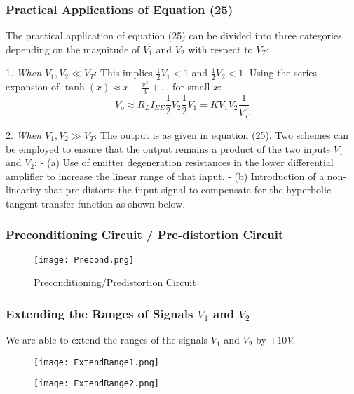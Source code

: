 \documentclass[a4paper,9pt,twoside,openany,twocolumn]{memoir}
\begin{document}
\subsubsection{Practical Applications of Equation (25)}

The practical application of equation (25) can be divided into three categories depending on the magnitude of \( V_1 \) and \( V_2 \) with respect to \( V_T \):

1. \textit{When \( V_1, V_2 \ll V_T \)}: 
   This implies \( \frac{1}{2} V_1 < 1 \) and \( \frac{1}{2} V_2 < 1 \).
   Using the series expansion of \( \tanh(x) \approx x - \frac{x^3}{3} + \ldots \) for small \( x \):
   \[
   V_o \approx R_L I_{EE} \frac{1}{2} V_2 \frac{1}{2} V_1 = K V_1 V_2 \frac{1}{V_T^2}
   \]

2. \textit{When \( V_1, V_2 \gg V_T \)}: 
   The output is as given in equation (25). Two schemes can be employed to ensure that the output remains a product of the two inputs \( V_1 \) and \( V_2 \):
   - (a) Use of emitter degeneration resistances in the lower differential amplifier to increase the linear range of that input.
   - (b) Introduction of a non-linearity that pre-distorts the input signal to compensate for the hyperbolic tangent transfer function as shown below.

\subsubsection{Preconditioning Circuit / Pre-distortion Circuit}
\begin{figure}[H]
    \centering
    \texttt{[image: Precond.png]}
    \caption{Preconditioning/Predistortion Circuit}
    \label{fig:precond}
\end{figure}
\subsubsection{Extending the Ranges of Signals \( V_1 \) and \( V_2 \)}

We are able to extend the ranges of the signals \( V_1 \) and \( V_2 \) by \( +10V \).
\begin{figure}[H]
    \centering
    \begin{minipage}[b]{0.45\textwidth}
        \centering
        \texttt{[image: ExtendRange1.png]}
        \label{fig:extendrange1}
    \end{minipage}
    \hfill
    \begin{minipage}[b]{0.45\textwidth}
        \centering
        \texttt{[image: ExtendRange2.png]}
        \label{fig:extendrange2}
    \end{minipage}

    \label{fig:extendranges}
\end{figure}
\end{document}
